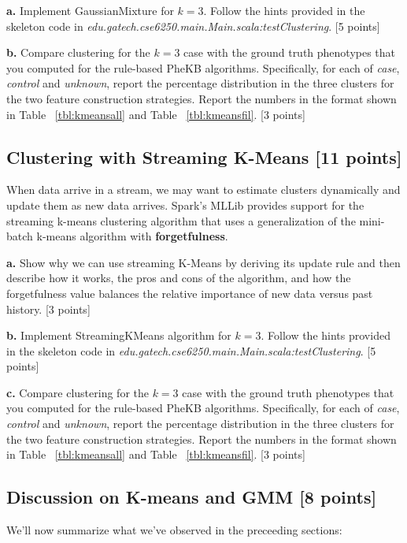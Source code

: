 \documentclass[12pt]{article}
\begin{document}
\textbf{a.} Implement GaussianMixture for $k=3$. Follow the hints provided in the skeleton code in \textit{edu.gatech.cse6250.main.Main.scala:testClustering}. [5 points]

\textbf{b.} Compare clustering for the $k=3$ case with the ground truth phenotypes that you computed for the rule-based PheKB algorithms. Specifically, for each of \textit{case}, \textit{control} and \textit{unknown}, report the percentage distribution in the three clusters for the two feature construction strategies. Report the numbers in the format shown in Table ~\ref{tbl:kmeansall} and Table ~\ref{tbl:kmeansfil}. [3 points]\\

\subsection{Clustering with Streaming K-Means  [11 points]}
When data arrive in a stream, we may want to estimate clusters dynamically and update them as new data arrives. Spark's MLLib provides support for the streaming k-means clustering algorithm that uses a generalization of the mini-batch k-means algorithm with \textbf{forgetfulness}.

\textbf{a.} Show why we can use streaming K-Means by deriving its update rule and then describe how it works, the pros and cons of the algorithm, and how the forgetfulness value balances the relative importance of new data versus past history. [3 points]

\textbf{b.} Implement StreamingKMeans algorithm  for $k=3$. Follow the hints provided in the skeleton code in \textit{edu.gatech.cse6250.main.Main.scala:testClustering}. [5 points]

\textbf{c.} Compare clustering for the $k=3$ case with the ground truth phenotypes that you computed for the rule-based PheKB algorithms. Specifically, for each of \textit{case}, \textit{control} and \textit{unknown}, report the percentage distribution in the three clusters for the two feature construction strategies. Report the numbers in the format shown in Table ~\ref{tbl:kmeansall} and Table ~\ref{tbl:kmeansfil}. [3 points]

\subsection{Discussion on K-means and GMM [8 points]}

We'll now summarize what we've observed in the preceeding sections:
\end{document}
